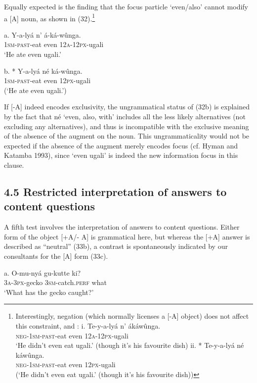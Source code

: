 \documentclass[output=paper]{langsci/langscibook}
\begin{document}
Equally expected is the finding that the focus particle ‘even/also’ cannot modify a [A] noun, as shown in (32).\footnote{%
  Interestingly, negation (which normally licenses a [-A] object) does not affect this constraint, and :
    \ea
      \ea
      \gll i.  Te-y-a-lyá    n’  ákáwûnga.\\
	\textsc{neg}{}-\textsc{1sm}{}-\textsc{past}{}-eat  even  \textsc{12a}{}-\textsc{12px}{}-ugali\\
      \glt   ‘He didn’t even eat ugali.’ (though it’s his favourite dish)
      \ex
      \gll ii.  * Te-y-a-lyá    né  káwûnga.\\
	\textsc{neg}{}-\textsc{1sm}{}-\textsc{past}{}-eat  even  \textsc{12px}{}-ugali\\
	(‘He didn’t even eat ugali.’ (though it’s his favourite dish))
      \z
    \z
}

\ea
\gll   a.  Y-a-lyá    n’  á-ká-wûnga.\\
         \textsc{1sm}{}-\textsc{past}{}-eat  even  \textsc{12a}{}-\textsc{12px}{}-ugali\\
\glt     ‘He ate even ugali.’
\z

\ea
\gll   b.  * Y-a-lyá    né  ká-wûnga.\\
         \textsc{1sm}{}-\textsc{past}{}-eat  even  \textsc{12px}{}-ugali\\
\glt     (‘He ate even ugali.’)
\z

If [-A] indeed encodes exclusivity, the ungrammatical status of (32b) is explained by the fact that né ‘even, also, with’ includes all the less likely alternatives (not excluding any alternatives), and thus is incompatible with the exclusive meaning of the absence of the augment on the noun. This ungrammaticality would not be expected if the absence of the augment merely encodes focus (cf. Hyman and Katamba 1993), since ‘even ugali’ is indeed the new information focus in this clause.

\subsection{4.5 Restricted interpretation of answers to content questions}

A fifth test involves the interpretation of answers to content questions. Either form of the object [+A/- A] is grammatical here, but whereas the [+A] answer is described as “neutral” (33b), a contrast is spontaneously indicated by our consultants for the [A] form (33c). 

\ea
\gll   a.  O-mu-nyá    gu-kutte    ki?\\
         \textsc{3a}{}-\textsc{3px}{}-gecko  \textsc{3sm}{}-catch.\textsc{perf}  what\\
\glt     ‘What has the gecko caught?’
\z
\end{document}
